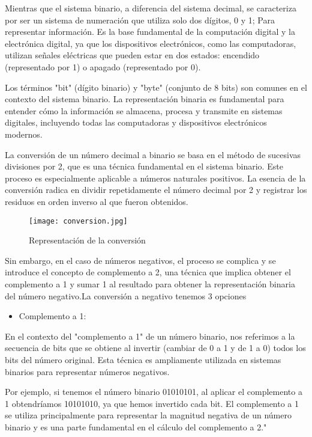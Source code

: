 \documentclass{IEEEcsmag}
\begin{document}
Mientras que el sistema binario, a diferencia del sistema decimal, se caracteriza por ser un sistema de numeración que utiliza solo dos dígitos, 0 y 1; Para representar información. Es la base fundamental de la computación digital y la electrónica digital, ya que los dispositivos electrónicos, como las computadoras, utilizan señales eléctricas que pueden estar en dos estados: encendido (representado por 1) o apagado (representado por 0).
\newline

Los términos "bit" (dígito binario) y "byte" (conjunto de 8 bits) son comunes en el contexto del sistema binario. La representación binaria es fundamental para entender cómo la información se almacena, procesa y transmite en sistemas digitales, incluyendo todas las computadoras y dispositivos electrónicos modernos.
\newline 

La conversión de un número decimal a binario se basa en el método de sucesivas divisiones por 2, que es una técnica fundamental en el sistema binario. Este proceso es especialmente aplicable a números naturales positivos. La esencia de la conversión radica en dividir repetidamente el número decimal por 2 y registrar los residuos en orden inverso al que fueron obtenidos.

\begin{figure} 
    \centering
    \texttt{[image: conversion.jpg]}
    \caption{Representación de la conversión}
    \label{fig: Conversion a Binario}
\end{figure}

Sin embargo, en el caso de números negativos, el proceso se complica y se introduce el concepto de complemento a 2, una técnica que implica obtener el complemento a 1 y sumar 1 al resultado para obtener la representación binaria del número negativo.La conversión a negativo tenemos 3 opciones 

\begin{itemize}
    \item Complemento a 1:
\end{itemize}
En el contexto del "complemento a 1" de un número binario, nos referimos a la secuencia de bits que se obtiene al invertir (cambiar de 0 a 1 y de 1 a 0) todos los bits del número original. Esta técnica es ampliamente utilizada en sistemas binarios para representar números negativos.
\newline

Por ejemplo, si tenemos el número binario 01010101, al aplicar el complemento a 1 obtendríamos 10101010, ya que hemos invertido cada bit. El complemento a 1 se utiliza principalmente para representar la magnitud negativa de un número binario y es una parte fundamental en el cálculo del complemento a 2."
\newline
\end{document}
